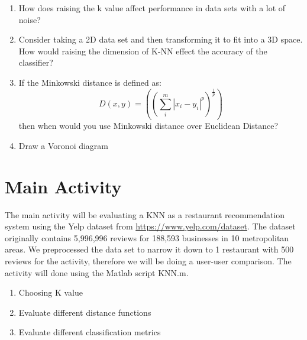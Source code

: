 \documentclass{report}
\begin{document}
\begin{enumerate}
\begin{figure}[H]
	\end{figure}
	\item How does raising the k value affect performance in data sets with a lot of noise? 
	\item Consider taking a 2D data set and then transforming it to fit into a 3D space. How would raising the dimension of K-NN effect the accuracy of the classifier?
	\item If the Minkowski distance is defined as: 
	\begin{equation}
	D (x, y) = ((\sum_{i}^{m}| x_{i} - y_{i}|^p)^\frac{1}{p})
	\end{equation}
     then when would you use Minkowski distance over Euclidean Distance?
	

\item Draw a Voronoi diagram
\end{enumerate}

\section*{Main Activity}

The main activity will be evaluating a KNN as a restaurant recommendation system using the Yelp dataset from \href{https://www.yelp.com/dataset}{https://www.yelp.com/dataset}.
The dataset originally contains 5,996,996 reviews for 188,593 businesses in 10 metropolitan areas.
We preprocessed the data set to narrow it down to 1 restaurant with 500 reviews for the activity, therefore we will be doing a user-user comparison.  
The activity will done using the Matlab script KNN.m.

\begin{enumerate}

\item Choosing K value

\item Evaluate different distance functions

\item Evaluate different classification metrics

\end{enumerate}

\end{document}
